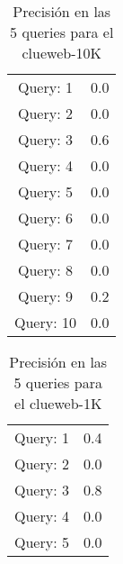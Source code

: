 \begin{table}
\centering
\begin{tabular}{cc}
Query: 1&0.0
\\
Query: 2&0.0
\\
Query: 3&0.6
\\
Query: 4&0.0
\\
Query: 5&0.0
\\
Query: 6&0.0
\\
Query: 7&0.0
\\
Query: 8&0.0
\\
Query: 9&0.2
\\
Query: 10&0.0
\\
\end{tabular}
\caption{Precisi\'{o}n en las 5 queries para el clueweb-10K}
\end{table}
\begin{table}
\centering
\begin{tabular}{cc}
Query: 1&0.4
\\
Query: 2&0.0
\\
Query: 3&0.8
\\
Query: 4&0.0
\\
Query: 5&0.0
\\
\end{tabular}
\caption{Precisi\'{o}n en las 5 queries para el clueweb-1K}
\end{table}
